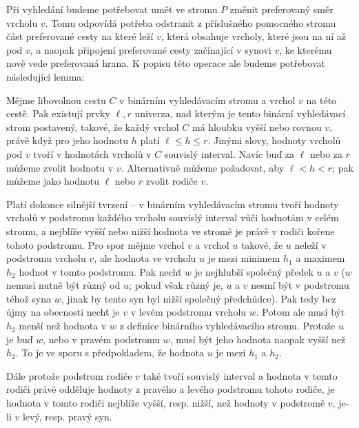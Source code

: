 Při vyhledání budeme potřebovat umět ve stromu $P$ změnit preferovaný směr vrcholu $v$. Tomu odpovídá potřeba odstranit z příslušného pomocného stromu část preferované cesty na které leží $v$, která obsahuje vrcholy, které jsou na ní až pod $v$, a naopak připojení preferované cesty začínající v synovi $v$, ke kterému nově vede preferovaná hrana. K popisu této operace ale budeme potřebovat následující lemma:

\begin{lemma}\label{lemma:interval}
Mějme libovolnou cestu $C$ v binárním vyhledávacím stromu a vrchol $v$ na této cestě. Pak existují prvky $\ell, r$  univerza, nad kterým je tento binární vyhledávací strom postavený, takové, že každý vrchol $C$ má hloubku vyšší nebo rovnou $v$, právě když pro jeho hodnotu $h$ platí $\ell \leq h \leq r$. Jinými slovy, hodnoty vrcholů pod $v$ tvoří v hodnotách vrcholů v $C$ souvislý interval. Navíc buď za $\ell$ nebo za $r$ můžeme zvolit hodnotu v $v$. Alternativně můžeme požadovat, aby $\ell < h < r$; pak můžeme jako hodnotu $\ell$ nebo $r$ zvolit rodiče $v$.
\end{lemma}

\begin{dukaz}
Platí dokonce silnější tvrzení -- v binárním vyhledávacím stromu tvoří hodnoty vrcholů v podstromu každého vrcholu souvislý interval vůči hodnotám v celém stromu, a nejblíže vyšší nebo nižší hodnota ve stromě je právě v rodiči kořene tohoto podstromu. Pro spor mějme vrchol $v$ a vrchol $u$ takové, že $u$ neleží v podstromu vrcholu $v$, ale hodnota ve vrcholu $u$ je mezi minimem $h_1$ a maximem $h_2$  hodnot v tomto podstromu. Pak nechť $w$ je nejhlubší společný předek $u$ a $v$ ($w$ nemusí nutně být různý od $u$; pokud však různý je, $u$ a $v$ nesmí být v podstromu téhož syna $w$, jinak by tento syn byl nižší společný předchůdce). Pak tedy bez újmy na obecnosti nechť je $v$ v levém podstromu vrcholu $w$. Potom ale musí být $h_2$ menší než hodnota v $w$ z definice binárního vyhledávacího stromu. Protože $u$ je buď $w$, nebo v pravém podstromu $w$, musí být jeho hodnota naopak vyšší než $h_2$. To je ve sporu s předpokladem, že hodnota $u$ je mezi $h_1$ a $h_2$.

Dále protože podstrom rodiče $v$ také tvoří souvislý interval a hodnota v tomto rodiči právě odděluje hodnoty z pravého a levého podstromu tohoto rodiče, je hodnota v tomto rodiči nejblíže vyšší, resp. nižší, než hodnoty v podstromě $v$, je-li $v$ levý, resp. pravý syn.
\end{dukaz}

